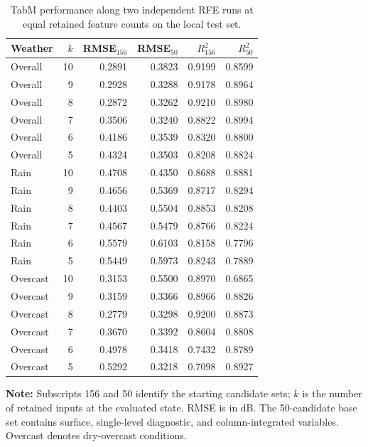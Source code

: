 \begin{table}[t]
\centering
\caption{TabM performance along two independent RFE runs
at equal retained feature counts on the local test set.}
\label{tab:Table05_TabM_Independent_Pool_Comparison}
\small
\setlength{\tabcolsep}{3pt}
\renewcommand{\arraystretch}{1.12}

\begin{tabular}{@{}l r r r r r@{}}
\toprule
Weather & $k$ & RMSE$_{156}$ & RMSE$_{50}$ &
$R^2_{156}$ & $R^2_{50}$ \\
\midrule
Overall & 10 & 0.2891 & 0.3823 & 0.9199 & 0.8599 \\
Overall & 9  & 0.2928 & 0.3288 & 0.9178 & 0.8964 \\
Overall & 8  & 0.2872 & 0.3262 & 0.9210 & 0.8980 \\
Overall & 7  & 0.3506 & 0.3240 & 0.8822 & 0.8994 \\
Overall & 6  & 0.4186 & 0.3539 & 0.8320 & 0.8800 \\
Overall & 5  & 0.4324 & 0.3503 & 0.8208 & 0.8824 \\
\midrule
Rain & 10 & 0.4708 & 0.4350 & 0.8688 & 0.8881 \\
Rain & 9  & 0.4656 & 0.5369 & 0.8717 & 0.8294 \\
Rain & 8  & 0.4403 & 0.5504 & 0.8853 & 0.8208 \\
Rain & 7  & 0.4567 & 0.5479 & 0.8766 & 0.8224 \\
Rain & 6  & 0.5579 & 0.6103 & 0.8158 & 0.7796 \\
Rain & 5  & 0.5449 & 0.5973 & 0.8243 & 0.7889 \\
\midrule
Overcast & 10 & 0.3153 & 0.5500 & 0.8970 & 0.6865 \\
Overcast & 9  & 0.3159 & 0.3366 & 0.8966 & 0.8826 \\
Overcast & 8  & 0.2779 & 0.3298 & 0.9200 & 0.8873 \\
Overcast & 7  & 0.3670 & 0.3392 & 0.8604 & 0.8808 \\
Overcast & 6  & 0.4978 & 0.3418 & 0.7432 & 0.8789 \\
Overcast & 5  & 0.5292 & 0.3218 & 0.7098 & 0.8927 \\

\bottomrule
\end{tabular}

\par\smallskip
\parbox{\columnwidth}{\footnotesize
\textbf{Note:} Subscripts 156 and 50 identify the starting
candidate sets; $k$ is the number of retained inputs at
the evaluated state. RMSE is in dB. The 50-candidate base
set contains surface, single-level diagnostic, and
column-integrated variables. Overcast denotes dry-overcast
conditions.}

\end{table}
